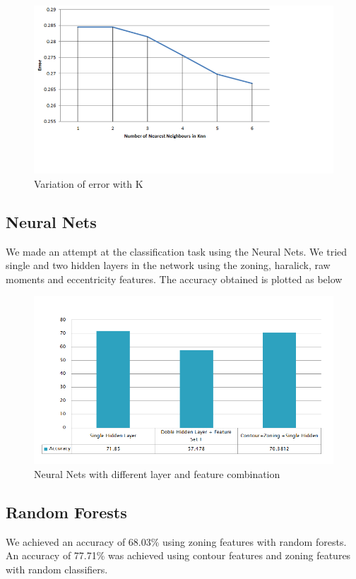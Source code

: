 \documentclass[conference]{IEEEtran}
\begin{document}
\begin{figure}[h]
  \centering
    \includegraphics[scale = 0.5]{knn_n_eff.png}
  \caption{Variation of  error with K}
\end{figure}

\subsection{Neural Nets}
We made an attempt at the classification task using the Neural Nets. We tried single and two hidden layers in the network using the zoning, haralick, raw moments and eccentricity features. The accuracy obtained is plotted as below
\begin{figure}[h]
  \centering
    \includegraphics[scale = 0.5]{Neural_diff.png}
  \caption{Neural Nets with different layer and feature combination}
\end{figure}

\subsection{Random Forests}
We achieved an accuracy of 68.03\% using zoning features with random forests. An accuracy of 77.71\% was achieved using contour features and zoning features with random classifiers.
\end{document}
